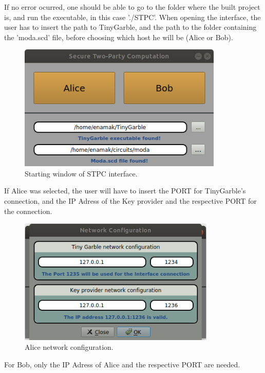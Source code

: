 \begin{refsection}
If no error ocurred, one should be able to go to the folder where the built project is, and run the executable, in this case './STPC'.
When opening the interface, the user has to insert the path to TinyGarble, and the path to the folder containing the 'moda.scd' file, before choosing which host he will be (Alice or Bob).

\begin{figure}[H]
	\centering
	\includegraphics[width=.8\textwidth, height=6cm]{./sdf/tiny_garble/figures/STPC_start.png}
    \caption{Starting window of STPC interface.}\label{fig:STPC_start}
\end{figure}

If Alice was selected, the user will have to insert the PORT for TinyGarble's connection, and the IP Adress of the Key provider and the respective PORT for the connection.

\begin{figure}[H]
	\centering
	\includegraphics[width=.8\textwidth, height=6cm]{./sdf/tiny_garble/figures/STPC_alice.png}
    \caption{Alice network configuration.}\label{fig:STPC_alice}
\end{figure}

For Bob, only the IP Adress of Alice and the respective PORT are needed.


\end{refsection}
